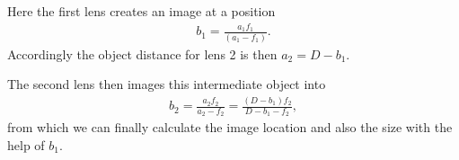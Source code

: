 \documentclass[letterpaper,10pt,english]{sphinxmanual}
\begin{document}
Here the first lens creates an image at a position
\begin{equation*}
\begin{split}b_1=\frac{a_1 f_1}{(a_1-f_1)}.\end{split}
\end{equation*}
Accordingly the object distance for lens 2 is then \(a_2=D-b_1\).

The second lens then images this intermediate object into
\begin{equation*}
\begin{split}b_2=\frac{a_2 f_2}{a_2-f_2}=\frac{(D-b_1) f_2}{D-b_1-f_2},\end{split}
\end{equation*}
from which we can finally calculate the image location and also the size with the help of \(b_1\).
\end{document}
